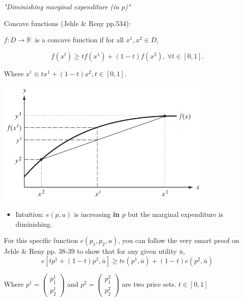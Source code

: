\documentclass{article}
\newcommand{\R}{\mathbb{R}}
\begin{document}
\begin{mdframed}[backgroundcolor=blue!20,linecolor=white]

\textit{"Diminishing marginal expenditure (in $p$)"}

Concave functions (Jehle \& Reny pp.534):

$f : D \to \R \ $ is a concave function if for all $x^1, x^2 \in D$,

$$f(x^t) \ge tf(x^1) + (1 - t)f(x^2), \ \forall t \in [0, 1].$$

Where $x^t \equiv tx^1 + (1-t)x^2, t \in [0,1].$

\vspace{2mm}
{\centering
\includegraphics[width=0.8\textwidth]{2.concavef}
\label{cf}}
\vspace{2mm}


\begin{itemize}
\item Intuition: $e(p,u)$ is increasing \textbf{in $p$} but the marginal expenditure is diminishing.
\end{itemize}

For this specific function $e(p_1,p_2,u)$, you can follow the very smart proof on Jehle \& Reny pp. 38-39 to show that for any given utility $\bar{u}$, $$e[tp^1+(1-t)p^2,\bar{u}] \ge te(p^1,\bar{u}) + (1-t)e(p^2,\bar{u})$$

Where $p^1 = \left(\begin{smallmatrix}p^1_1 \\ p^1_2\end{smallmatrix}\right)$ and $p^2 = \left(\begin{smallmatrix}p^2_1 \\ p^2_2\end{smallmatrix}\right)$ are two price sets. $t \in [0,1]$

\vspace{2mm}



\end{mdframed}
\end{document}
